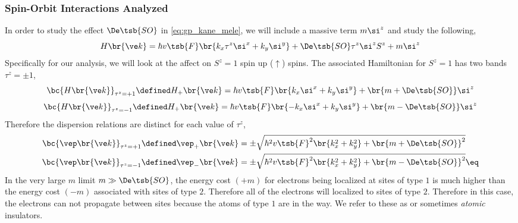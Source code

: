 \documentclass{article}
\newcommand{\uu}{\uparrow}
\begin{document}
\subsubsection{Spin-Orbit Interactions Analyzed}

In order to study the effect $\De\tsb{SO}$ in \cref{eq:gp_kane_mele}, we will include a massive term $m \si^{z}$ and study the following,
\[ H\br{\ve k} =\hbar v\tsb{F} \br{k_x \tau^{z} \si^x + k_y \si^{y}} + \De\tsb{SO} \tau^{z} \si^{z} S^{z} + m \si^{z}\]
Specifically for our analysis, we will look at the affect on $S^{z} = 1$ spin up ($\uu$) spins. The associated Hamiltonian for $S^{z} = 1$ has two bands $\tau^{z} = \pm 1$,
\[ \bc{H\br{\ve k}}_{\tau^{z} = +1} \defined H_{+}\br{\ve k} =\hbar v\tsb{F} \br{k_x \si^x + k_y \si^{y}} + \br{m + \De\tsb{SO}} \si^{z}\]
\[ \bc{H\br{\ve k}}_{\tau^{z} = -1} \defined H_{+}\br{\ve k} =\hbar v\tsb{F} \br{-k_x \si^x + k_y \si^{y}} + \br{m - \De\tsb{SO}} \si^{z}\]
Therefore the dispersion relations are distinct for each value of $\tau^{z}$,
\begin{align*}
    \bc{\vep\br{\ve k}}_{\tau^{z} = +1}\defined \vep_{+}\br{\ve k} &= \pm\sqrt{\hbar^2 v\tsb{F}^2 \br{k_x^2 + k_y^2} + \br{m + \De\tsb{SO}}^2} \\
    \bc{\vep\br{\ve k}}_{\tau^{z} = -1}\defined \vep_{-}\br{\ve k} &= \pm\sqrt{\hbar^2 v\tsb{F}^2 \br{k_x^2 + k_y^2} + \br{m - \De\tsb{SO}}^2} \eq \label{eq:gp_SOminus}
\end{align*}
In the very large $m$ limit $m \gg \De\tsb{SO}$, the energy cost $(+m)$ for electrons being localized at sites of type $1$ is much higher than the energy cost $(-m)$ associated with sites of type $2$. Therefore all of the electrons will localized to sites of type $2$. Therefore in this case, the electrons can not propagate between sites because the atoms of type $1$ are in the way. We refer to these as  or sometimes \textit{atomic} insulators. \\
\end{document}
